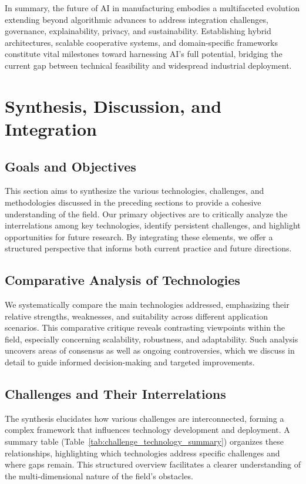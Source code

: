 \documentclass[sigconf]{acmart}
\begin{document}
In summary, the future of AI in manufacturing embodies a multifaceted evolution extending beyond algorithmic advances to address integration challenges, governance, explainability, privacy, and sustainability. Establishing hybrid architectures, scalable cooperative systems, and domain-specific frameworks constitute vital milestones toward harnessing AI’s full potential, bridging the current gap between technical feasibility and widespread industrial deployment.

\newpage  
  


\section{Synthesis, Discussion, and Integration}

\subsection{Goals and Objectives}
This section aims to synthesize the various technologies, challenges, and methodologies discussed in the preceding sections to provide a cohesive understanding of the field. Our primary objectives are to critically analyze the interrelations among key technologies, identify persistent challenges, and highlight opportunities for future research. By integrating these elements, we offer a structured perspective that informs both current practice and future directions.

\subsection{Comparative Analysis of Technologies}
We systematically compare the main technologies addressed, emphasizing their relative strengths, weaknesses, and suitability across different application scenarios. This comparative critique reveals contrasting viewpoints within the field, especially concerning scalability, robustness, and adaptability. Such analysis uncovers areas of consensus as well as ongoing controversies, which we discuss in detail to guide informed decision-making and targeted improvements.

\subsection{Challenges and Their Interrelations}
The synthesis elucidates how various challenges are interconnected, forming a complex framework that influences technology development and deployment. A summary table (Table~\ref{tab:challenge_technology_summary}) organizes these relationships, highlighting which technologies address specific challenges and where gaps remain. This structured overview facilitates a clearer understanding of the multi-dimensional nature of the field's obstacles.
\end{document}
